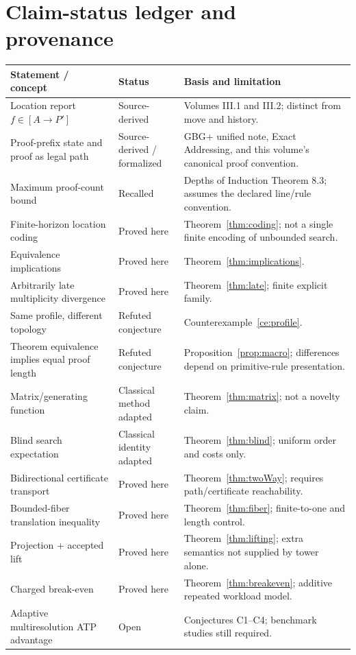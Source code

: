 \documentclass[11pt,letterpaper]{article}
\theoremstyle{definition}
\begin{document}
\appendix
\section{Claim-status ledger and provenance}
\small
\begin{longtable}{p{.33\linewidth}p{.18\linewidth}p{.40\linewidth}}
\toprule Statement / concept & Status & Basis and limitation\\\midrule\endhead
Location report $f\in[A\to P']$ & Source-derived & Volumes III.1 and III.2; distinct from move and history.\\
Proof-prefix state and proof as legal path & Source-derived / formalized & GBG+ unified note, Exact Addressing, and this volume's canonical proof convention.\\
Maximum proof-count bound & Recalled & Depths of Induction Theorem 8.3; assumes the declared line/rule convention.\\
Finite-horizon location coding & Proved here & Theorem~\ref{thm:coding}; not a single finite encoding of unbounded search.\\
Equivalence implications & Proved here & Theorem~\ref{thm:implications}.\\
Arbitrarily late multiplicity divergence & Proved here & Theorem~\ref{thm:late}; finite explicit family.\\
Same profile, different topology & Refuted conjecture & Counterexample~\ref{ce:profile}.\\
Theorem equivalence implies equal proof length & Refuted conjecture & Proposition~\ref{prop:macro}; differences depend on primitive-rule presentation.\\
Matrix/generating function & Classical method adapted & Theorem~\ref{thm:matrix}; not a novelty claim.\\
Blind search expectation & Classical identity adapted & Theorem~\ref{thm:blind}; uniform order and costs only.\\
Bidirectional certificate transport & Proved here & Theorem~\ref{thm:twoWay}; requires path/certificate reachability.\\
Bounded-fiber translation inequality & Proved here & Theorem~\ref{thm:fiber}; finite-to-one and length control.\\
Projection + accepted lift & Proved here & Theorem~\ref{thm:lifting}; extra semantics not supplied by tower alone.\\
Charged break-even & Proved here & Theorem~\ref{thm:breakeven}; additive repeated workload model.\\
Adaptive multiresolution ATP advantage & Open & Conjectures C1--C4; benchmark studies still required.\\\bottomrule
\end{longtable}
\normalsize
\end{document}
